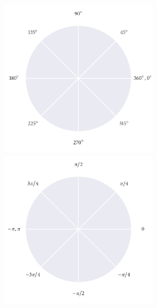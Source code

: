 \documentclass[12pt]{beamer}
\begin{document}
\begin{frame}
    \vspace{0.85cm}
    \centering
    \includegraphics[width=0.5\textwidth]{degree_axes.pdf}%
    \includegraphics[width=0.5\textwidth]{radian_axes.pdf}
\end{frame}
\end{document}
